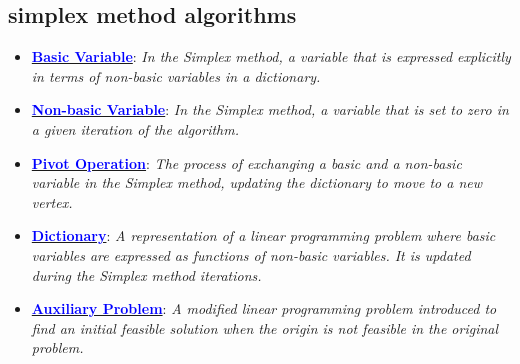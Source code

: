 \documentclass{article}%
\begin{document}
\begin{itemize}[leftmargin=*]
\subsection{simplex method algorithms}%
\label{subsec:simplexmethodalgorithms}%
\begin{itemize}[leftmargin=*]%
\item \href{https://www.math.purdue.edu/~yipn/421/2024-08-27-ExSimplex.pdf#page=6}{\textbf{\textcolor{blue}{Basic Variable}}}: \emph{In the Simplex method, a variable that is expressed explicitly in terms of non-basic variables in a dictionary.}%
\item \href{https://www.math.purdue.edu/~yipn/421/2024-08-27-ExSimplex.pdf#page=6}{\textbf{\textcolor{blue}{Non-basic Variable}}}: \emph{In the Simplex method, a variable that is set to zero in a given iteration of the algorithm.}%
\item \href{https://www.math.purdue.edu/~yipn/421/2024-08-27-ExSimplex.pdf#page=9}{\textbf{\textcolor{blue}{Pivot Operation}}}: \emph{The process of exchanging a basic and a non-basic variable in the Simplex method, updating the dictionary to move to a new vertex.}%
\item \href{https://www.math.purdue.edu/~yipn/421/2024-08-27-ExSimplex.pdf#page=26}{\textbf{\textcolor{blue}{Dictionary}}}: \emph{A representation of a linear programming problem where basic variables are expressed as functions of non-basic variables. It is updated during the Simplex method iterations.}%
\item \href{https://www.math.purdue.edu/~yipn/421/2024-08-27-ExSimplex.pdf#page=32}{\textbf{\textcolor{blue}{Auxiliary Problem}}}: \emph{A modified linear programming problem introduced to find an initial feasible solution when the origin is not feasible in the original problem.}%
\end{itemize}

%
\end{itemize}%
\newpage

%
\end{document}
